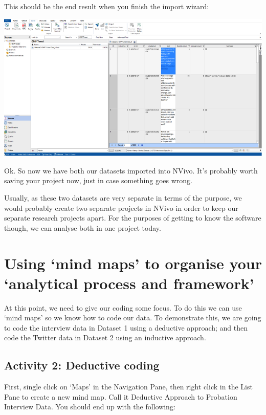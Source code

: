 \documentclass[]{book}
\theoremstyle{definition}
\theoremstyle{definition}
\theoremstyle{definition}
\theoremstyle{remark}
\begin{document}
This should be the end result when you finish the import wizard:

\includegraphics{imgs/qual_38.png}

Ok. So now we have both our datasets imported into NVivo. It's probably
worth saving your project now, just in case something goes wrong.

Usually, as these two datasets are very separate in terms of the
purpose, we would probably create two separate projects in NVivo in
order to keep our separate research projects apart. For the purposes of
getting to know the software though, we can analyse both in one project
today.

\hypertarget{using-mind-maps-to-organise-your-analytical-process-and-framework}{%
\section{Using `mind maps' to organise your `analytical process and
framework'}\label{using-mind-maps-to-organise-your-analytical-process-and-framework}}

At this point, we need to give our coding some focus. To do this we can
use `mind maps' so we know how to code our data. To demonstrate this, we
are going to code the interview data in Dataset 1 using a deductive
approach; and then code the Twitter data in Dataset 2 using an inductive
approach.

\hypertarget{activity-2-deductive-coding}{%
\subsection{Activity 2: Deductive
coding}\label{activity-2-deductive-coding}}

First, single click on `Maps' in the Navigation Pane, then right click
in the List Pane to create a new mind map. Call it Deductive Approach to
Probation Interview Data. You should end up with the following:
\end{document}
